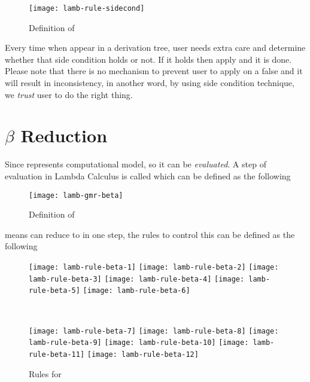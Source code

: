 \documentclass[master.tex]{subfiles}
\begin{document}
\begin{figure}[H]
    \centering
\begin{minipage}{0.7\textwidth}
    \texttt{[image: lamb-rule-sidecond]}
\end{minipage}
\caption{Definition of }
\end{figure}

Every time when  appear in a derivation tree, user needs
extra care and determine whether that side condition holds or not. If it holds
then apply  and it is done. Please note that there is no
mechanism to prevent user to apply  on a false
 and it will result in inconsistency, in another word, by
using side condition technique, we \emph{trust} user to do the right thing.

\section{$\beta$ Reduction}

Since  represents computational model, so it can be
\emph{evaluated}. A step of evaluation in Lambda Calculus is called
 which can be defined as the following

\begin{figure}[H]
    \centering
\begin{minipage}{0.7\textwidth}
    \texttt{[image: lamb-gmr-beta]}
\end{minipage}
\caption{Definition of }
\end{figure}

 means  can reduce to  in one step, the
rules to control this can be defined as the following

\begin{figure}[H]
    \centering

\begin{minipage}{0.48\textwidth}
\begin{flushleft}
\texttt{[image: lamb-rule-beta-1]}
\texttt{[image: lamb-rule-beta-2]}
\texttt{[image: lamb-rule-beta-3]}
\texttt{[image: lamb-rule-beta-4]}
\texttt{[image: lamb-rule-beta-5]}
\texttt{[image: lamb-rule-beta-6]}
\end{flushleft}
\end{minipage}
~
\begin{minipage}{0.48\textwidth}
\begin{flushright}
\texttt{[image: lamb-rule-beta-7]}
\texttt{[image: lamb-rule-beta-8]}
\texttt{[image: lamb-rule-beta-9]}
\texttt{[image: lamb-rule-beta-10]}
\texttt{[image: lamb-rule-beta-11]}
\texttt{[image: lamb-rule-beta-12]}
\end{flushright}
\end{minipage}

    \caption{Rules for }
\end{figure}
\end{document}
